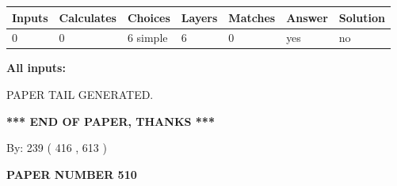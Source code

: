 \documentclass[12pt]{article}
\begin{document}
 
\noindent{}
 
 
   
   
   
   
\noindent\begin{tabular}{|l|l|l|l|l|l|l|}
 \hline
Inputs & Calculates & Choices & Layers & Matches & Answer & Solution \\ \hline
 0  & 
 0  & 
 6
  simple  
  & 
 6  & 
 0  & 
  yes & 
  no 
  \\ \hline
 \end{tabular}
   
   
   
   
\noindent{}
   
   
   
   
\noindent\vspace{0.1in}\hspace{-0.08in} {\textbf{\Large{All inputs: }}}
   
   
   
   
   
   
 \vspace{0.2in}
 
   
   
\vspace{2.0in} PAPER TAIL GENERATED.
   
   
   
   
\vspace{1.0in} 
{\textbf{\large{ *** END OF PAPER, THANKS *** }}} 
   
   
\hspace{1.0in} By: 
 239 ( 416 ,  613 )
   
   
   
   
\newpage 
\setcounter{page}{ 
   510001 } 
   
   
   
   
 {\textbf{ \Large{ PAPER NUMBER  510  }}}
   
   
\vspace{0.2in}
   
   
   
   
   
   
   
   
 \vspace{0.2in}
 
\end{document}
